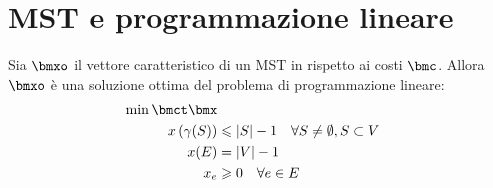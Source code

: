 \documentclass[\main/main.tex]{subfiles}
\begin{document}
\section{MST e programmazione lineare}
\begin{theorem}
  Sia \(\bmxo\) il vettore caratteristico di un MST in rispetto ai costi \(\bmc \). Allora \(\bmxo\) è una soluzione ottima del problema di programmazione lineare:
  \begin{align*}
    \min \bmct\bmx                                                                 \\
    x\rnd{\gamma(S)} & \leq \abs{S} -1 \quad \forall S \neq \emptyset, S \subset V \\
    x(E)             & = \abs{V} -1                                                \\
    x_e              & \geq 0                       \quad \forall e \in E
  \end{align*}
\end{theorem}
\end{document}
